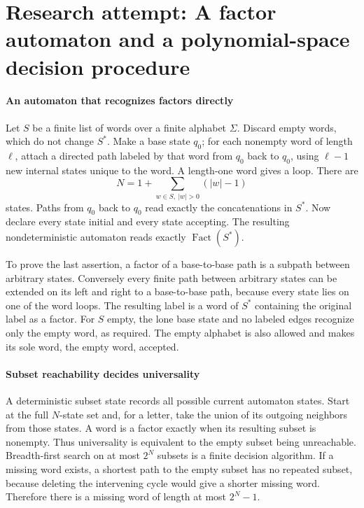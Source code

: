 \documentclass[11pt]{article}
\begin{document}
\section{Research attempt: A factor automaton and a polynomial-space decision procedure}

\paragraph{An automaton that recognizes factors directly}
Let $S$ be a finite list of words over a finite alphabet $\Sigma$. Discard empty words, which do not change $S^*$. Make a base state $q_0$; for each nonempty word of length $\ell$, attach a directed path labeled by that word from $q_0$ back to $q_0$, using $\ell-1$ new internal states unique to the word. A length-one word gives a loop. There are
\[
 N=1+\sum_{w\in S,\ |w|>0}(|w|-1)
\]
states. Paths from $q_0$ back to $q_0$ read exactly the concatenations in $S^*$. Now declare every state initial and every state accepting. The resulting nondeterministic automaton reads exactly $\operatorname{Fact}(S^*)$.

To prove the last assertion, a factor of a base-to-base path is a subpath between arbitrary states. Conversely every finite path between arbitrary states can be extended on its left and right to a base-to-base path, because every state lies on one of the word loops. The resulting label is a word of $S^*$ containing the original label as a factor. For $S$ empty, the lone base state and no labeled edges recognize only the empty word, as required. The empty alphabet is also allowed and makes its sole word, the empty word, accepted.

\paragraph{Subset reachability decides universality}
A deterministic subset state records all possible current automaton states. Start at the full $N$-state set and, for a letter, take the union of its outgoing neighbors from those states. A word is a factor exactly when its resulting subset is nonempty. Thus universality is equivalent to the empty subset being unreachable. Breadth-first search on at most $2^N$ subsets is a finite decision algorithm. If a missing word exists, a shortest path to the empty subset has no repeated subset, because deleting the intervening cycle would give a shorter missing word. Therefore there is a missing word of length at most $2^N-1$.
\end{document}
